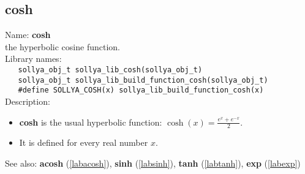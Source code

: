 \subsection{cosh}
\label{labcosh}
\noindent Name: \textbf{cosh}\\
\phantom{aaa}the hyperbolic cosine function.\\[0.2cm]
\noindent Library names:\\
\verb|   sollya_obj_t sollya_lib_cosh(sollya_obj_t)|\\
\verb|   sollya_obj_t sollya_lib_build_function_cosh(sollya_obj_t)|\\
\verb|   #define SOLLYA_COSH(x) sollya_lib_build_function_cosh(x)|\\[0.2cm]
\noindent Description: \begin{itemize}

\item \textbf{cosh} is the usual hyperbolic function: $\cosh(x) = \frac{e^x + e^{-x}}{2}$.

\item It is defined for every real number $x$.
\end{itemize}
See also: \textbf{acosh} (\ref{labacosh}), \textbf{sinh} (\ref{labsinh}), \textbf{tanh} (\ref{labtanh}), \textbf{exp} (\ref{labexp})
